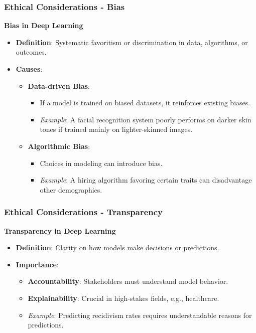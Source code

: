 \documentclass[aspectratio=169]{beamer}
\begin{document}
\begin{frame}[fragile]
    \frametitle{Ethical Considerations - Bias}
    \textbf{Bias in Deep Learning}
    \begin{itemize}
        \item \textbf{Definition}: Systematic favoritism or discrimination in data, algorithms, or outcomes.
        \item \textbf{Causes}:
        \begin{itemize}
            \item \textbf{Data-driven Bias}:
            \begin{itemize}
                \item If a model is trained on biased datasets, it reinforces existing biases.
                \item \textit{Example}: A facial recognition system poorly performs on darker skin tones if trained mainly on lighter-skinned images.
            \end{itemize}
            \item \textbf{Algorithmic Bias}:
            \begin{itemize}
                \item Choices in modeling can introduce bias.
                \item \textit{Example}: A hiring algorithm favoring certain traits can disadvantage other demographics.
            \end{itemize}
        \end{itemize}
    \end{itemize}
\end{frame}

\begin{frame}[fragile]
    \frametitle{Ethical Considerations - Transparency}
    \textbf{Transparency in Deep Learning}
    \begin{itemize}
        \item \textbf{Definition}: Clarity on how models make decisions or predictions.
        \item \textbf{Importance}:
        \begin{itemize}
            \item \textbf{Accountability}: Stakeholders must understand model behavior.
            \item \textbf{Explainability}: Crucial in high-stakes fields, e.g., healthcare.
            \item \textit{Example}: Predicting recidivism rates requires understandable reasons for predictions.
        \end{itemize}
    \end{itemize}
\end{frame}
\end{document}
